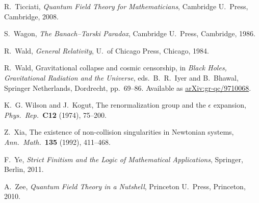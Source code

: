 \documentclass[12pt]{article}
\begin{document}
\begin{thebibliography}{10}
 R.\ Ticciati, \textsl{Quantum Field Theory for Mathematicians},
Cambridge U.\ Press, Cambridge, 2008.

 S.\ Wagon, {\sl The Banach--Tarski Paradox}, Cambridge
U.\ Press, Cambridge, 1986.

 R.\ Wald, \textsl{General Relativity}, U.\ of Chicago Press, Chicago, 
1984.

 R.\ Wald, Gravitational collapse and cosmic censorship, in \textsl{Black Holes, Gravitational Radiation and the Universe}, eds.\ 
B.\ R.\ Iyer and B.\ Bhawal, Springer Netherlands, Dordrecht, pp.\ 69--86.
Available as \href{http://arxiv.org/abs/gr-qc/9710068}{arXiv:gr-qc/9710068}.

 K.\ G. Wilson and J.\ Kogut, The renormalization group and the $\epsilon$ expansion, \textsl{Phys.\ Rep.\ }\textbf{C12} (1974), 75--200. 

 Z.\ Xia, The existence of non-collision singularities in Newtonian systems, \textsl{Ann.\ Math.\ }{\bf 135} (1992), 411--468. 

  F.\ Ye, \textsl{Strict Finitism and the Logic of Mathematical Applications}, Springer,
Berlin, 2011.

 A.\ Zee, \textsl{Quantum Field Theory in a Nutshell}, Princeton U.\ 
Press, Princeton, 2010.

\end{thebibliography}
\end{document}
